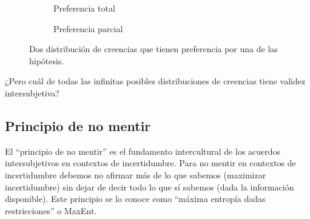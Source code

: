 \documentclass[a4paper,11pt]{book}
\theoremstyle{definition}
\begin{document}

\begin{figure}[ht!]
 \centering
 \begin{subfigure}[b]{0.48\textwidth}
 \centering
    \caption{Preferencia total}
    \label{fig:preferencia_total}
 \end{subfigure}
 \begin{subfigure}[b]{0.48\textwidth}
 \centering
    \caption{Preferencia parcial}
    \label{fig:preferencia_parcial}
 \end{subfigure}
\caption{Dos distribución de creencias que tienen preferencia por una de las hipótesis.}
 \label{fig:distribucion_de_creencias}
\end{figure}


¿Pero cuál de todas las infinitas posibles distribuciones de creencias tiene validez intersubjetiva?

\subsection{Principio de no mentir}\label{sec:principio_indiferencia}

El ``principio de no mentir'' es el fundamento intercultural de los acuerdos intersubjetivos en contextos de incertidumbre.
%
Para no mentir en contextos de incertidumbre debemos no afirmar más de lo que sabemos (maximizar incertidumbre) sin dejar de decir todo lo que sí sabemos (dada la información disponible).
%
Este principio se lo conoce como ``máxima entropía dadas restricciones'' o MaxEnt.

\end{document}

